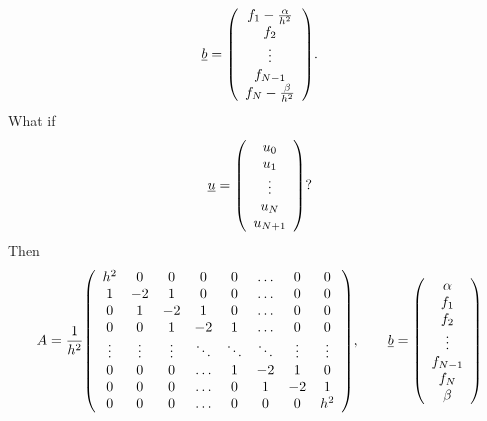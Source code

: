 \documentclass{article}
\begin{document}
        \begin{align}
            \underline{b} = \qty(\begin{array}{c}
                f_1 - \frac{\alpha}{h^2} \\ f_2 \\ \vdots \\ f_{N-1} \\ f_N - \frac{\beta}{h^2}
            \end{array}).
        \end{align}
        What if
        \begin{align}
            \underline{u} = \qty(\begin{array}{c}
                u_0 \\ u_1 \\ \vdots \\ u_N \\ u_{N+1}
            \end{array})?
        \end{align}
        Then
        \begin{align}
            A = \frac{1}{h^2}\qty(\begin{array}{ccccccccc}
                h^2 & 0 & 0 & 0 & 0 & \dots & 0 & 0 \\
                1 & -2 & 1 & 0 & 0 & \dots & 0 & 0 \\
                0 & 1 & -2 & 1 & 0 & \dots & 0 & 0 \\
                0 & 0 & 1 & -2 & 1 & \dots & 0 & 0 \\
                \vdots & \vdots & \vdots & \ddots & \ddots & \ddots & \vdots & \vdots \\
                0 & 0 & 0 & \dots & 1 & -2 & 1 & 0 \\
                0 & 0 & 0 & \dots & 0 & 1 & -2 & 1 \\
                0 & 0 & 0 & \dots & 0 & 0 & 0 & h^2
            \end{array}), \qquad \underline{b} = \qty(\begin{array}{c}
                \alpha \\ f_1 \\ f_2 \\ \vdots \\ f_{N-1} \\ f_N \\ \beta
            \end{array})
        \end{align}
\end{document}
